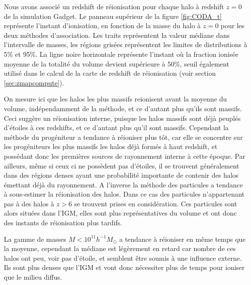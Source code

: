 Nous avons associé un redshift de réionisation pour chaque halo à redshift $z=0$ de la simulation Gadget.
Le panneau supérieur de la figure \ref{fig:CODA_t} représente l'instant d'ionisation, en fonction de la masse du halo à $z=0$ pour les deux méthodes d'association.
Les traits représentent la valeur médiane dans l'intervalle de masses, les régions grisées représentent les limites de distributions à 5\% et 95\%.
La ligne noire horizontale représente l'instant où la fraction ionisée moyenne de la totalité du volume devient supérieure à 50\%, seuil également utilisé dans le calcul de la carte de redshift de réionisation (voir section \ref{sec:zmapcompute}).

On mesure ici que les halos les plus massifs reionisent avant la moyenne du volume, indépendamment de la méthode, et ce d'autant plus qu'ils sont massifs.
Ceci suggère un réionisation interne, puisque les halos massifs sont déjà peuplés d'étoiles à ces redshifts, et ce d'autant plus qu'il sont massifs.
Cependant la méthode du progéniteur a tendance à réioniser plus tôt, car elle se concentre sur les progéniteurs les plus massifs les halos déjà formés à haut redshift, et possédant donc les premières sources de rayonnement interne à cette époque.
Par ailleurs, même si ceux ci ne possèdent pas d'étoiles, il se trouvent généralement dans des régions denses ayant une probabilité importante de contenir des halos émettant déjà du rayonnement.
A l'inverse la méthode des particules a tendance à sous-estimer la réionisation des halos. 
Dans ce cas des particules n'appartenant pas à des halos à $z>6$ se trouvent prises en considération.
Ces particules sont alors situées dans l'\ac{IGM}, elles sont plus représentatives du volume et ont donc des instants de réionisation plus tardifs.

La gamme de masses $M <10^{11} h^{-1}M_\odot$ a tendance à réioniser en même temps que la moyenne, cependant la médiane est légèrement en retard car nombre de ces halos ont peu, voir pas d'étoile, et semblent être soumis à une influence externe.
Ils sont plus denses que l'\ac{IGM} et vont donc nécessiter plus de temps pour ioniser que le milieu diffus.



